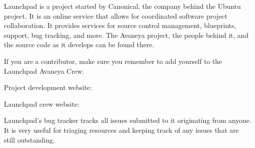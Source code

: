 

Launchpad is a project started by Canonical, the company behind the Ubuntu project. It is an online service that allows for coordinated software project collaboration. It provides services for source control management, blueprints, support, bug tracking, and more. The Avaneya project, the people behind it, and the source code as it develops can be found there.

If you are a contributor, make sure you remember to add yourself to the Launchpad Avaneya Crew.

Project development website:\crlf
{}

Launchpad crew website:\crlf
{}

Launchpad's bug tracker tracks all issues submitted to it originating from anyone. It is very useful for triaging resources and keeping track of any issues that are still outstanding.


